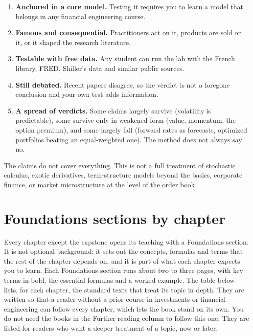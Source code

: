 \begin{enumerate}
  \item \textbf{Anchored in a core model.} Testing it requires you to learn a model that belongs in any financial engineering course.
  \item \textbf{Famous and consequential.} Practitioners act on it, products are sold on it, or it shaped the research literature.
  \item \textbf{Testable with free data.} Any student can run the lab with the French library, FRED, Shiller's data and similar public sources.
  \item \textbf{Still debated.} Recent papers disagree, so the verdict is not a foregone conclusion and your own test adds information.
  \item \textbf{A spread of verdicts.} Some claims largely survive (volatility is predictable), some survive only in weakened form (value, momentum, the option premium), and some largely fail (forward rates as forecasts, optimized portfolios beating an equal-weighted one). The method does not always say no.
\end{enumerate}

The claims do not cover everything. This is not a full treatment of stochastic calculus, exotic derivatives, term-structure models beyond the basics, corporate finance, or market microstructure at the level of the order book. 

\section*{Foundations sections by chapter}

Every chapter except the capstone opens its teaching with a Foundations section. It is not optional background: it sets out the concepts, formulas and terms that the rest of the chapter depends on, and it is part of what each chapter expects you to learn. Each Foundations section runs about two to three pages, with key terms in bold, the essential formulas and a worked example. The table below lists, for each chapter, the standard texts that treat its topic in depth. They are written so that a reader without a prior course in investments or financial engineering can follow every chapter, which lets the book stand on its own. You do not need the books in the Further reading column to follow this one. They are listed for readers who want a deeper treatment of a topic, now or later.

